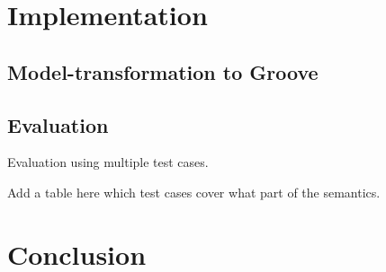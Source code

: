 \documentclass[adraft, copyright, creativecommons]{eptcs} %
\begin{document}

\section{Implementation}
\subsection{Model-transformation to Groove}
\subsection{Evaluation}
Evaluation using multiple test cases.

Add a table here which test cases cover what part of the semantics.
\section{Conclusion}


\end{document}
